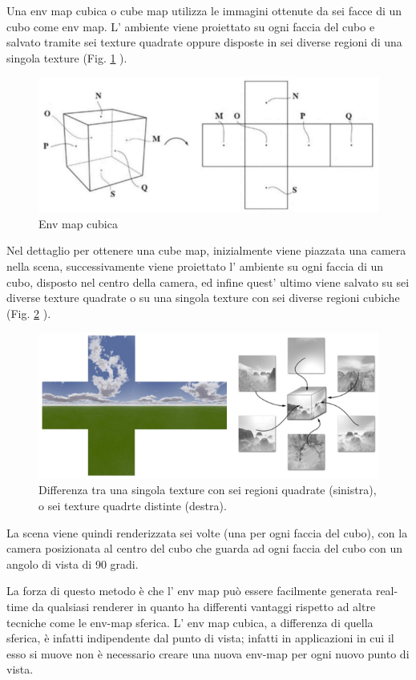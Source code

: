 Una env map cubica o cube map utilizza le immagini ottenute da sei facce di un cubo come env map.
L’ ambiente viene proiettato su ogni faccia del cubo e salvato tramite sei texture quadrate oppure disposte in sei diverse regioni di una singola texture (Fig. \ref{fig:stato_arte_cubo_envmap} ).
\\
\begin{figure}[htb]
 \centering
 \includegraphics[width=0.5\linewidth]{images/chapter_stato_arte/stato_arte_cubo_envmap.png}\hfill
 \caption[Env map cubica]{Env map cubica}
 \label{fig:stato_arte_cubo_envmap}
\end{figure}

Nel dettaglio per ottenere una cube map, inizialmente viene piazzata una camera nella scena, successivamente viene proiettato l’ ambiente su ogni faccia di un cubo, disposto nel centro della camera, ed infine quest’ ultimo viene salvato su sei diverse texture quadrate o su una singola texture con sei diverse regioni cubiche (Fig. \ref{fig:stato_arte_texture_env_cubo} ).
\\
\begin{figure}[htb]
 \centering
 \includegraphics[width=0.5\linewidth]{images/chapter_stato_arte/stato_arte_texture_env_cubo.png}\hfill
 \caption[Env map texture]{Differenza tra una singola texture con sei regioni quadrate (sinistra), o sei texture quadrte distinte (destra).}
 \label{fig:stato_arte_texture_env_cubo}
\end{figure}

La scena viene quindi renderizzata sei volte (una per ogni faccia del cubo), con la camera posizionata al centro del cubo che guarda ad ogni faccia del cubo con un angolo di vista di 90 gradi.

La forza di questo metodo è che l’ env map può essere facilmente generata real-time da qualsiasi renderer in quanto ha differenti vantaggi rispetto ad altre tecniche come le env-map sferica.
L’ env map cubica, a differenza di quella sferica, è infatti indipendente dal punto di vista; infatti in applicazioni in cui il esso si muove non è necessario creare una nuova env-map per ogni nuovo punto di vista.

